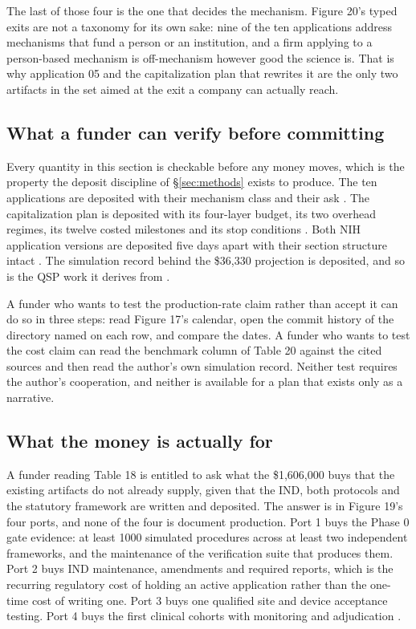 The last of those four is the one that decides the mechanism. Figure 20's typed
exits are not a taxonomy for its own sake: nine of the ten applications address
mechanisms that fund a person or an institution, and a firm applying to a
person-based mechanism is off-mechanism however good the science is. That is why
application 05 and the capitalization plan that rewrites it are the only two
artifacts in the set aimed at the exit a company can actually reach.

\subsection{What a funder can verify before committing}

Every quantity in this section is checkable before any money moves, which is the
property the deposit discipline of \S\ref{sec:methods} exists to produce. The ten applications
are deposited with their mechanism class and their ask
\cite{tenapps2026}. The capitalization plan is deposited with its four-layer
budget, its two overhead regimes, its twelve costed milestones and its stop
conditions \cite{capplan2026}. Both NIH application versions are deposited five
days apart with their section structure intact
\cite{rfarm27001v1, rfarm27001v2}. The simulation record behind the \$36,330
projection is deposited, and so is the QSP work it derives from
\cite{qspmetpancre, digitaltwinfda2025}.

A funder who wants to test the production-rate claim rather than accept it can
do so in three steps: read Figure 17's calendar, open the commit history of the
directory named on each row, and compare the dates. A funder who wants to test
the cost claim can read the benchmark column of Table 20 against the cited
sources and then read the author's own simulation record. Neither test requires
the author's cooperation, and neither is available for a plan that exists only
as a narrative.

\subsection{What the money is actually for}

A funder reading Table 18 is entitled to ask what the \$1,606,000 buys that the
existing artifacts do not already supply, given that the IND, both protocols and
the statutory framework are written and deposited. The answer is in Figure 19's
four ports, and none of the four is document production. Port 1 buys the Phase 0
gate evidence: at least 1000 simulated procedures across at least two
independent frameworks, and the maintenance of the verification suite that
produces them. Port 2 buys IND maintenance, amendments and required reports,
which is the recurring regulatory cost of holding an active application rather
than the one-time cost of writing one. Port 3 buys one qualified site and device
acceptance testing. Port 4 buys the first clinical cohorts with monitoring and
adjudication \cite{capplan2026}.

